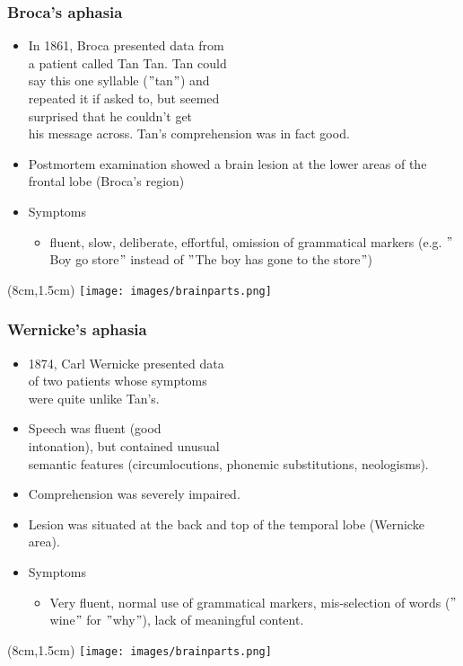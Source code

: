 \documentclass[12pt, table]{beamer}
\begin{document}
\begin{frame}
\frametitle{Broca's aphasia}
\begin{itemize}
\item In 1861, Broca presented data from \\
 a patient called Tan Tan. Tan could \\ 
say this one syllable ($"$tan$"$) and \\ 
repeated it if asked to, but seemed \\ surprised that he couldn't get \\ his message across. Tan's comprehension was in fact good. 
\item Postmortem examination showed a brain lesion at the lower areas of the frontal lobe (Broca's region) 
\item Symptoms
\begin{itemize}
\item fluent, slow, deliberate, effortful, omission of grammatical markers (e.g. $"$Boy go store$"$ instead of $"$The boy has gone to the store$"$)
\end{itemize}
\end{itemize}
\begin{textblock*}{8cm}(8cm,1.5cm)
\texttt{[image: images/brainparts.png]}
\end{textblock*}
\end{frame}

\begin{frame}
\frametitle{Wernicke's aphasia}
\begin{itemize}
\item 1874, Carl Wernicke presented data \\ of two patients whose symptoms \\ were quite unlike Tan's. 
\item Speech was fluent (good \\ intonation), but contained unusual \\ semantic features (circumlocutions, phonemic substitutions, neologisms). 
\item Comprehension was severely impaired. 
\item Lesion was situated at the back and top of the temporal lobe (Wernicke area). 
\item Symptoms
\begin{itemize}
\item Very fluent, normal use of grammatical markers, mis-selection of words ($"$wine$"$ for $"$why$"$), lack of meaningful content.
\end{itemize}
\end{itemize}
\begin{textblock*}{8cm}(8cm,1.5cm)
\texttt{[image: images/brainparts.png]}
\end{textblock*}
\end{frame}
\end{document}

